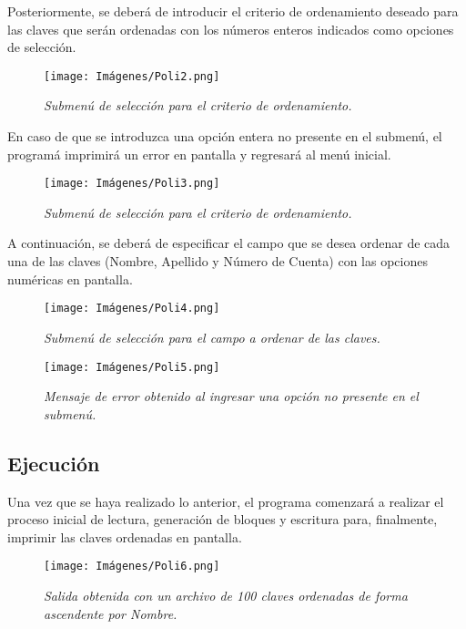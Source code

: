 \documentclass[letterpaper,12pt]{extarticle}
\begin{document}
Posteriormente, se deberá de introducir el criterio de ordenamiento deseado para las claves que serán ordenadas con los números enteros indicados como opciones de selección.

\begin{figure}[h!]
\centering
\texttt{[image: Imágenes/Poli2.png]}
\caption{\textit{Submenú de selección para el criterio de ordenamiento.}}
\label{fig:Poli2}
\end{figure}

En caso de que se introduzca una opción entera no presente en el submenú, el programá imprimirá un error en pantalla y regresará al menú inicial.

\begin{figure}[h!]
\centering
\texttt{[image: Imágenes/Poli3.png]}
\caption{\textit{Submenú de selección para el criterio de ordenamiento.}}
\label{fig:Poli3}
\end{figure}

A continuación, se deberá de especificar el campo que se desea ordenar de cada una de las claves (Nombre, Apellido y Número de Cuenta) con las opciones numéricas en pantalla.

\begin{figure}[h!]
\centering
\texttt{[image: Imágenes/Poli4.png]}
\caption{\textit{Submenú de selección para el campo a ordenar de las claves.}}
\label{fig:Poli4}
\end{figure}

\begin{figure}[h!]
\centering
\texttt{[image: Imágenes/Poli5.png]}
\caption{\textit{Mensaje de error obtenido al ingresar una opción no presente en el submenú.}}
\label{fig:Poli5}
\end{figure}

\pagebreak

\subsection{Ejecución}

\noindent Una vez que se haya realizado lo anterior, el programa comenzará a realizar el proceso inicial de lectura, generación de bloques y escritura para, finalmente, imprimir las claves ordenadas en pantalla.

\begin{figure}[h!]
\centering
\texttt{[image: Imágenes/Poli6.png]}
\caption{\textit{Salida obtenida con un archivo de 100 claves ordenadas de forma ascendente por Nombre.}}
\label{fig:Poli56}
\end{figure}
\end{document}
